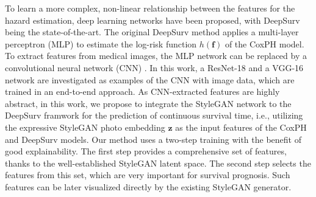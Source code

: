 \documentclass[runningheads]{llncs}
\newcommand{\vz}{\boldsymbol{z}}
\newcommand{\vf}{\boldsymbol{f}}
\newcommand{\vtheta}{\boldsymbol{\theta}}
\newcommand{\TODO}[1]{\textcolor{red}{#1}}
\begin{document}
To learn a more complex, non-linear relationship between the features for the hazard estimation, deep learning networks have been proposed, with DeepSurv \cite{zhu2016deep,katzman2018deepsurv} being the state-of-the-art. The original DeepSurv method applies a multi-layer perceptron (MLP) to estimate the log-risk function $h(\vf)$ of the CoxPH model. To extract features from medical images, the MLP network can be replaced by a convolutional neural network (CNN) \cite{zhu2016deep,gurovich2019identifying}. In this work, a ResNet-18 and a VGG-16 network are investigated as examples of the CNN with image data, which are trained in an end-to-end approach. As CNN-extracted features are highly abstract, in this work, we propose to integrate the StyleGAN network to the DeepSurv framwork for the prediction of continuous survival time, i.e., utilizing the expressive StyleGAN photo embedding $\vz$ as the input features of the CoxPH and DeepSurv models. Our method uses a two-step training with the benefit of good explainability. The first step provides a comprehensive set of features, thanks to the well-established StyleGAN latent space. The second step selects the features from this set, which are very important for survival prognosis. Such features can be later visualized directly by the existing StyleGAN generator.


\end{document}
